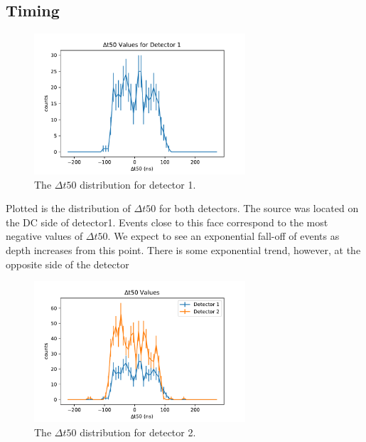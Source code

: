 \subsection*{Timing}

\begin{figure}[h]
\begin{centering}
\includegraphics[width=0.7\textwidth]{./figures/t50s_det1.pdf}
\caption{The $\Delta t50$ distribution for detector 1.}
\label{t50_1}
\end{centering}
\end{figure}

Plotted is the distribution of $\Delta t50$ for both detectors. The source was located on the DC side of detector1. Events close to this face correspond to the most negative values of $\Delta t50$. We expect to see an exponential fall-off of events as depth increases from this point. There is some exponential trend, however, at the opposite side of the detector 

\begin{figure}[h]
\begin{centering}
\includegraphics[width=0.7\textwidth]{./figures/t50s_det2.pdf}
\caption{The $\Delta t50$ distribution for detector 2.}
\label{t50_2}
\end{centering}
\end{figure}

